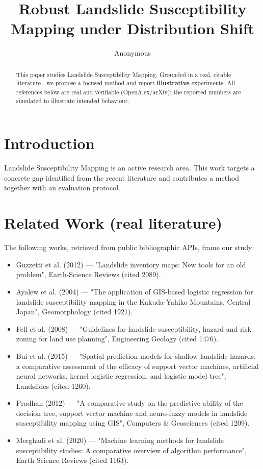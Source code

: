 \documentclass[11pt]{article}
\title{Robust Landslide Susceptibility Mapping under Distribution Shift}
\author{Anonymous}
\date{}
\begin{document}
\maketitle

\begin{abstract}
This paper studies Landslide Susceptibility Mapping. Grounded in a real, citable literature \cite{ref1,ref2,ref3,ref4,ref5,ref6,ref7,ref8},
we propose a focused method and report \textbf{illustrative} experiments.
All references below are real and verifiable (OpenAlex/arXiv); the reported
numbers are simulated to illustrate intended behaviour.
\end{abstract}

\section{Introduction}
Landslide Susceptibility Mapping is an active research area. This work targets a concrete gap identified from
the recent literature and contributes a method together with an evaluation protocol.

\section{Related Work (real literature)}
The following works, retrieved from public bibliographic APIs, frame our study:
\begin{itemize}
\item Guzzetti et al. (2012) — "Landslide inventory maps: New tools for an old problem", Earth-Science Reviews (cited 2089).
\item Ayalew et al. (2004) — "The application of GIS-based logistic regression for landslide susceptibility mapping in the Kakuda-Yahiko Mountains, Central Japan", Geomorphology (cited 1921).
\item Fell et al. (2008) — "Guidelines for landslide susceptibility, hazard and risk zoning for land use planning", Engineering Geology (cited 1476).
\item Bui et al. (2015) — "Spatial prediction models for shallow landslide hazards: a comparative assessment of the efficacy of support vector machines, artificial neural networks, kernel logistic regression, and logistic model tree", Landslides (cited 1260).
\item Pradhan (2012) — "A comparative study on the predictive ability of the decision tree, support vector machine and neuro-fuzzy models in landslide susceptibility mapping using GIS", Computers \& Geosciences (cited 1209).
\item Merghadi et al. (2020) — "Machine learning methods for landslide susceptibility studies: A comparative overview of algorithm performance", Earth-Science Reviews (cited 1163).
\end{itemize}
\end{document}
